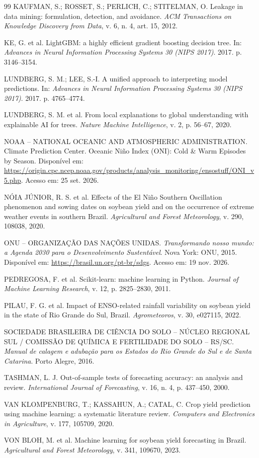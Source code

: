 \documentclass[12pt]{article}
\begin{document}
\begin{thebibliography}{99}
KAUFMAN, S.; ROSSET, S.; PERLICH, C.; STITELMAN, O. Leakage in data mining:
formulation, detection, and avoidance. \emph{ACM Transactions on Knowledge
Discovery from Data}, v. 6, n. 4, art. 15, 2012.

KE, G. et al. LightGBM: a highly efficient gradient boosting decision tree.
In: \emph{Advances in Neural Information Processing Systems 30 (NIPS
2017)}. 2017. p. 3146--3154.

LUNDBERG, S. M.; LEE, S.-I. A unified approach to interpreting model
predictions. In: \emph{Advances in Neural Information Processing Systems 30
(NIPS 2017)}. 2017. p. 4765--4774.

LUNDBERG, S. M. et al. From local explanations to global understanding with
explainable AI for trees. \emph{Nature Machine Intelligence}, v. 2, p.
56--67, 2020.

NOAA -- NATIONAL OCEANIC AND ATMOSPHERIC ADMINISTRATION. Climate Prediction
Center. Oceanic Niño Index (ONI): Cold \& Warm Episodes by Season.
Disponível em:
\url{https://origin.cpc.ncep.noaa.gov/products/analysis_monitoring/ensostuff/ONI_v5.php}.
Acesso em: 25 set. 2026.

NÓIA JÚNIOR, R. S. et al. Effects of the El Niño Southern Oscillation
phenomenon and sowing dates on soybean yield and on the occurrence of
extreme weather events in southern Brazil. \emph{Agricultural and Forest
Meteorology}, v. 290, 108038, 2020.

ONU -- ORGANIZAÇÃO DAS NAÇÕES UNIDAS. \emph{Transformando nosso mundo: a
Agenda 2030 para o Desenvolvimento Sustentável}. Nova York: ONU, 2015.
Disponível em: \url{https://brasil.un.org/pt-br/sdgs}. Acesso em: 19 nov.
2026.

PEDREGOSA, F. et al. Scikit-learn: machine learning in Python. \emph{Journal
of Machine Learning Research}, v. 12, p. 2825--2830, 2011.

PILAU, F. G. et al. Impact of ENSO-related rainfall variability on soybean
yield in the state of Rio Grande do Sul, Brazil. \emph{Agrometeoros}, v. 30,
e027115, 2022.

SOCIEDADE BRASILEIRA DE CIÊNCIA DO SOLO -- NÚCLEO REGIONAL SUL / COMISSÃO
DE QUÍMICA E FERTILIDADE DO SOLO -- RS/SC. \emph{Manual de calagem e
adubação para os Estados do Rio Grande do Sul e de Santa Catarina}. Porto
Alegre, 2016.

TASHMAN, L. J. Out-of-sample tests of forecasting accuracy: an analysis and
review. \emph{International Journal of Forecasting}, v. 16, n. 4, p.
437--450, 2000.

VAN KLOMPENBURG, T.; KASSAHUN, A.; CATAL, C. Crop yield prediction using
machine learning: a systematic literature review. \emph{Computers and
Electronics in Agriculture}, v. 177, 105709, 2020.

VON BLOH, M. et al. Machine learning for soybean yield forecasting in
Brazil. \emph{Agricultural and Forest Meteorology}, v. 341, 109670, 2023.

\end{thebibliography}
\end{document}
